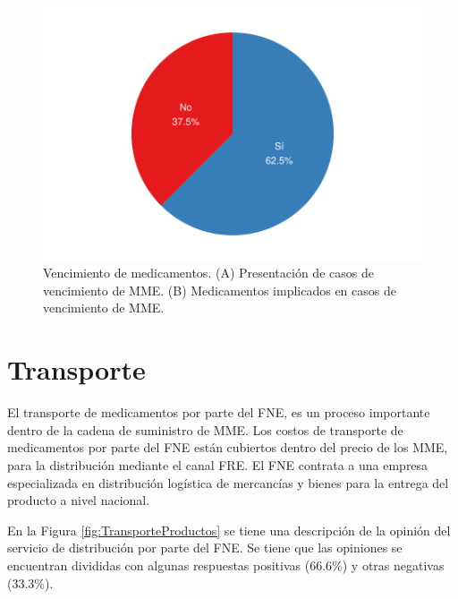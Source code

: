 \documentclass[
  oneside]{book}
\begin{document}
\begin{figure}[t]

{\centering \includegraphics[width=1\linewidth]{InformeFinal_files/figure-latex/CasosVencimiento1-1} 

}

\caption{Vencimiento de medicamentos. (A) Presentación de casos de vencimiento de MME. (B) Medicamentos implicados en casos de vencimiento de MME.}\label{fig:CasosVencimiento1}
\end{figure}

\hypertarget{transporte}{%
\section{Transporte}\label{transporte}}

El transporte de medicamentos por parte del FNE, es un proceso importante dentro de la cadena de suministro de MME. Los costos de transporte de medicamentos por parte del FNE están cubiertos dentro del precio de los MME, para la distribución mediante el canal FRE. El FNE contrata a una empresa especializada en distribución logística de mercancías y bienes para la entrega del producto a nivel nacional.

En la Figura \ref{fig:TransporteProductos} se tiene una descripción de la opinión del servicio de distribución por parte del FNE. Se tiene que las opiniones se encuentran divididas con algunas respuestas positivas (66.6\%) y otras negativas (33.3\%).
\end{document}

